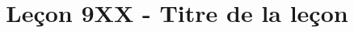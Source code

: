\documentclass{article}
\title{Leçon 9XX - Titre de la leçon}
\begin{document}
\maketitle

\rapports

\indispensables

\pieges

\idees

\questionsclassiques


\begin{itemize}

\end{itemize}

\dev

\begin{itemize}

\end{itemize}
\end{document}
